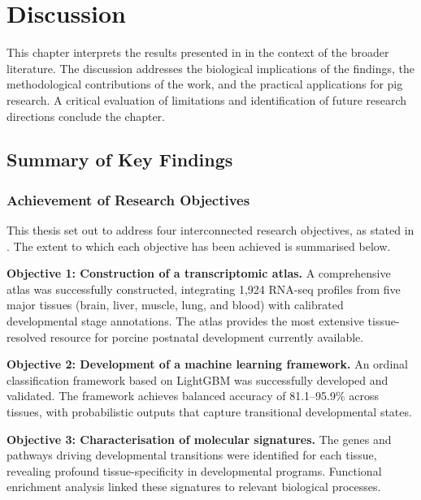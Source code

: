 \chapter{Discussion}\label{chapter:discussion}

\clearpage
\FloatBarrier

This chapter interprets the results presented in  in the context of the broader literature. The discussion addresses the biological implications of the findings, the methodological contributions of the work, and the practical applications for pig research. A critical evaluation of limitations and identification of future research directions conclude the chapter.


\section{Summary of Key Findings}\label{sec:discussion:summary}

\subsection{Achievement of Research Objectives}

This thesis set out to address four interconnected research objectives, as stated in . The extent to which each objective has been achieved is summarised below.

\textbf{Objective 1: Construction of a transcriptomic atlas.} A comprehensive atlas was successfully constructed, integrating 1,924 RNA-seq profiles from five major tissues (brain, liver, muscle, lung, and blood) with calibrated developmental stage annotations. The atlas provides the most extensive tissue-resolved resource for porcine postnatal development currently available.

\textbf{Objective 2: Development of a machine learning framework.} An ordinal classification framework based on LightGBM was successfully developed and validated. The framework achieves balanced accuracy of 81.1--95.9\% across tissues, with probabilistic outputs that capture transitional developmental states.

\textbf{Objective 3: Characterisation of molecular signatures.} The genes and pathways driving developmental transitions were identified for each tissue, revealing profound tissue-specificity in developmental programs. Functional enrichment analysis linked these signatures to relevant biological processes.

